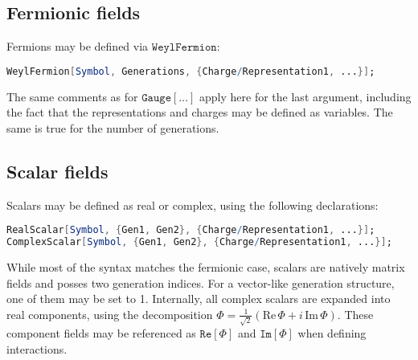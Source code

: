\documentclass{scrartcl}
\begin{document}
\subsection{Fermionic fields}
Fermions may be defined via $\mathtt{WeylFermion}$:
\begin{lstlisting}[language=mathematica,mathescape,columns=flexible,backgroundcolor=\color{light-gray}]
WeylFermion[Symbol, Generations, {Charge/Representation1, ...}];
\end{lstlisting}
The same comments as for $\mathtt{Gauge[\dots]}$ apply here for the last argument, including the fact that the representations and charges may be defined as variables. The same is true for the number of generations.
\subsection{Scalar fields}
Scalars may be defined as real or complex, using the following declarations:
\begin{lstlisting}[language=mathematica,mathescape,columns=flexible,backgroundcolor=\color{light-gray}]
RealScalar[Symbol, {Gen1, Gen2}, {Charge/Representation1, ...}];
ComplexScalar[Symbol, {Gen1, Gen2}, {Charge/Representation1, ...}];
\end{lstlisting}
While most of the syntax matches the fermionic case, scalars are natively matrix fields and posses two generation indices. For a vector-like generation structure, one of them may be set to 1.\newline
Internally, all complex scalars are expanded into real components, using the decomposition $\Phi = \frac{1}{\sqrt{2}} \left(\mathrm{Re} \, \Phi + i \, \mathrm{Im} \,\Phi\right)$. These component fields may be referenced as $\mathtt{Re[\Phi]}$ and $\mathtt{Im[\Phi]}$ when defining interactions.
\end{document}
